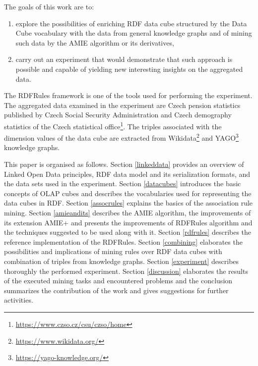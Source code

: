 The goals of this work are to:

\begin{enumerate}
    \item explore the possibilities of enriching RDF data cube structured by the Data Cube vocabulary with the data from general knowledge graphs and of mining such data by the AMIE algorithm or its derivatives,
    \item carry out an experiment that would demonstrate that such approach is possible and capable of yielding new interesting insights on the aggregated data. 
\end{enumerate}

The RDFRules framework is one of the tools used for performing the experiment. The aggregated data examined in the experiment are Czech pension statistics published by Czech Social Security Administration and Czech demography statistics of the Czech statistical office\footnote{\href{https://www.czso.cz/csu/czso/home}{https://www.czso.cz/csu/czso/home}}. The triples associated with the dimension values of the data cube are extracted from Wikidata\footnote{\href{https://www.wikidata.org/}{https://www.wikidata.org/}} and YAGO\footnote{\href{https://yago-knowledge.org/}{https://yago-knowledge.org/}} knowledge graphs.

This paper is organised as follows. Section \ref{linkeddata} provides an overview of Linked Open Data principles, RDF data model and its serialization formats, and the data sets used in the experiment. Section \ref{datacubes} introduces the basic concepts of OLAP cubes and describes the vocabularies used for representing the data cubes in RDF. Section \ref{assocrules} explains the basics of the association rule mining. Section \ref{amieandits} describes the AMIE algorithm, the improvements of its extension AMIE+ and presents the improvements of RDFRules algorithm and the techniques suggested to be used along with it. Section \ref{rdfrules} describes the reference implementation of the RDFRules. Section \ref{combining} elaborates the possibilities and implications of mining rules over RDF data cubes with combination of triples from knowledge graphs. Section \ref{experiment} describes thoroughly the performed experiment. Section \ref{discussion} elaborates the results of the executed mining tasks and encountered problems and the conclusion summarizes the contribution of the work and gives suggestions for further activities.


